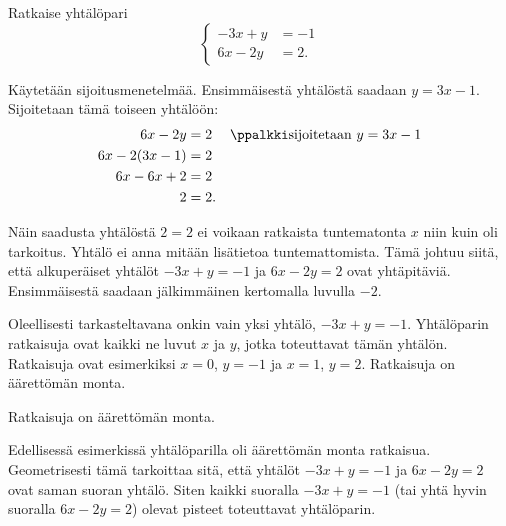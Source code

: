 \begin{esimerkki}
Ratkaise yhtälöpari
\[
\left\{
\begin{aligned}
-3x+y&= -1 \\
6x-2y&= 2.
\end{aligned}
\right.
\]
\begin{esimratk}
Käytetään sijoitusmenetelmää. Ensimmäisestä yhtälöstä saadaan $y=3x-1$. Sijoitetaan tämä toiseen yhtälöön:
\begin{align*}
6x-2y&= 2 && \ppalkki \text{sijoitetaan $y=3x-1$} \\
6x-2(3x-1)&= 2 && \\
6x-6x+2&= 2 && \\
2&= 2. &&
\end{align*}
\end{esimratk}
Näin saadusta yhtälöstä $2=2$ ei voikaan ratkaista tuntematonta $x$ niin kuin oli tarkoitus. Yhtälö ei anna mitään lisätietoa tuntemattomista. Tämä johtuu siitä, että alkuperäiset yhtälöt $-3x+y= -1$ ja $6x-2y= 2$ ovat yhtäpitäviä. Ensimmäisestä saadaan jälkimmäinen kertomalla luvulla $-2$.

Oleellisesti tarkasteltavana onkin vain yksi yhtälö, $-3x+y= -1$. Yhtälöparin ratkaisuja ovat kaikki ne luvut $x$ ja $y$, jotka toteuttavat tämän yhtälön. Ratkaisuja ovat esimerkiksi $x=0$, $y=-1$ ja $x=1$, $y=2$. Ratkaisuja on äärettömän monta.
\begin{esimvast}
Ratkaisuja on äärettömän monta.
\end{esimvast}
\end{esimerkki}

Edellisessä esimerkissä yhtälöparilla oli äärettömän monta ratkaisua. Geometrisesti tämä tarkoittaa sitä, että yhtälöt $-3x+y= -1$ ja $6x-2y= 2$ ovat saman suoran yhtälö. Siten kaikki suoralla $-3x+y= -1$ (tai yhtä hyvin suoralla $6x-2y= 2$) olevat pisteet toteuttavat yhtälöparin.

% 


